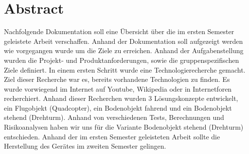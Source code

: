 \section{Abstract}
Nachfolgende Dokumentation soll eine Übersicht über die im ersten Semester geleistete Arbeit verschaffen. Anhand der Dokumentation soll aufgezeigt werden wie vorgegangen wurde um die Ziele zu erreichen. Anhand der Aufgabenstellung wurden die Projekt- und Produktanforderungen, sowie die gruppenspezifischen Ziele definiert. In einem ersten Schritt wurde eine Technologierecherche gemacht. Ziel dieser Recherche war es, bereits vorhandene Technologien zu finden. Es wurde vorwiegend im Internet auf Youtube, Wikipedia oder in Internetforen recherchiert. Anhand dieser Recherchen wurden 3 Lösungskonzepte entwickelt, ein Flugobjekt (Quadcopter), ein Bodenobjekt fahrend und ein Bodenobjekt stehend (Drehturm). Anhand von verschiedenen Tests, Berechnungen und Risikoanalysen haben wir uns für die Variante Bodenobjekt stehend (Drehturm) entschieden. Anhand der im ersten Semester geleisteten Arbeit sollte die Herstellung des Gerätes im zweiten Semester gelingen.